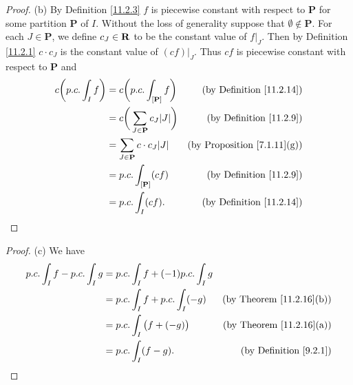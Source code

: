 \begin{proof}{(b)}
    By Definition \ref{11.2.3} \(f\) is piecewise constant with respect to \(\mathbf{P}\) for some partition \(\mathbf{P}\) of \(I\).
    Without the loss of generality suppose that \(\emptyset \notin \mathbf{P}\).
    For each \(J \in \mathbf{P}\), we define \(c_J \in \mathbf{R}\) to be the constant value of \(f|_J\).
    Then by Definition \ref{11.2.1} \(c \cdot c_J\) is the constant value of \((cf)|_J\).
    Thus \(cf\) is piecewise constant with respect to \(\mathbf{P}\) and
    \begin{align*}
        c \bigg(p.c. \int_I f\bigg) & = c \bigg(p.c. \int_{[\mathbf{P}]} f\bigg)          & \text{(by Definition \ref{11.2.14})}    \\
                                    & = c \bigg(\sum_{J \in \mathbf{P}} c_J \abs{J}\bigg) & \text{(by Definition \ref{11.2.9})}     \\
                                    & = \sum_{J \in \mathbf{P}} c \cdot c_J \abs{J}       & \text{(by Proposition \ref{7.1.11}(g))} \\
                                    & = p.c. \int_{[\mathbf{P}]} (c f)                    & \text{(by Definition \ref{11.2.9})}     \\
                                    & = p.c. \int_I (c f).                                & \text{(by Definition \ref{11.2.14})}
    \end{align*}
\end{proof}

\begin{proof}{(c)}
    We have
    \begin{align*}
        p.c. \int_I f - p.c. \int_I g & = p.c. \int_I f + (-1) p.c. \int_I g                                        \\
                                      & = p.c. \int_I f + p.c. \int_I (-g)   & \text{(by Theorem \ref{11.2.16}(b))} \\
                                      & = p.c. \int_I \big(f + (-g)\big)     & \text{(by Theorem \ref{11.2.16}(a))} \\
                                      & = p.c. \int_I (f - g).               & \text{(by Definition \ref{9.2.1})}
    \end{align*}
\end{proof}

